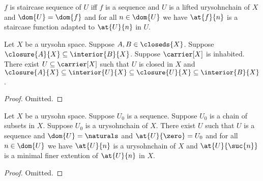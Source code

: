 \begin{definition}\label{staircase_sequence}
    $f$ is staircase sequence of $U$ iff $f$ is a sequence and $U$ is a lifted urysohnchain of $X$ and $\dom{U} = \dom{f}$ and for all $n \in \dom{U}$ we have $\at{f}{n}$ is a staircase function adapted to $\at{U}{n}$ in $U$.
\end{definition}





\begin{theorem}\label{urysohnsetinbeetween}
    Let $X$ be a urysohn space.
    Suppose $A,B \in \closeds{X}$.
    Suppose $\closure{A}{X} \subseteq \interior{B}{X}$.
    Suppose $\carrier[X]$ is inhabited.
    There exist $U \subseteq \carrier[X]$ such that $U$ is closed in $X$ and $\closure{A}{X} \subseteq \interior{U}{X} \subseteq \closure{U}{X} \subseteq \interior{B}{X}$.
\end{theorem}
\begin{proof}
    Omitted.
\end{proof}


\begin{theorem}\label{induction_on_urysohnchains}
    Let $X$ be a urysohn space.
    Suppose $U_0$ is a sequence.
    Suppose $U_0$ is a chain of subsets in $X$.
    Suppose $U_0$ is a urysohnchain of $X$.
    There exist $U$ such that $U$ is a sequence and $\dom{U} = \naturals$ and $\at{U}{\zero} = U_0$ and for all $n \in \dom{U}$ we have $\at{U}{n}$ is a urysohnchain of $X$ and $\at{U}{\suc{n}}$ is a minimal finer extention of $\at{U}{n}$ in $X$.
\end{theorem}
\begin{proof}
    Omitted.
\end{proof}





